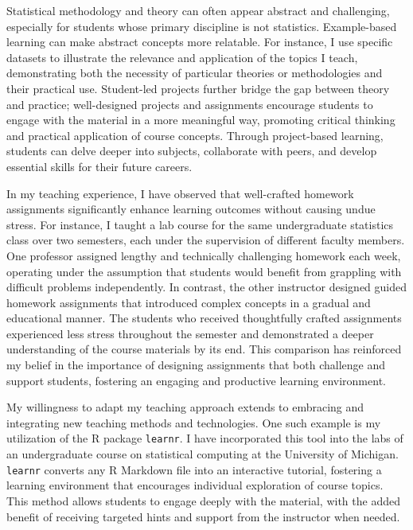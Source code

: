 \documentclass{article}
\begin{document}
Statistical methodology and theory can often appear abstract and challenging, especially for students whose primary discipline is not statistics.
Example-based learning can make abstract concepts more relatable.
For instance, I use specific datasets to illustrate the relevance and application of the topics I teach, demonstrating both the necessity of particular theories or methodologies and their practical use.
Student-led projects further bridge the gap between theory and practice; well-designed projects and assignments encourage students to engage with the material in a more meaningful way, promoting critical thinking and practical application of course concepts.
Through project-based learning, students can delve deeper into subjects, collaborate with peers, and develop essential skills for their future careers.

In my teaching experience, I have observed that well-crafted homework assignments significantly enhance learning outcomes without causing undue stress.
For instance, I taught a lab course for the same undergraduate statistics class over two semesters, each under the supervision of different faculty members.
One professor assigned lengthy and technically challenging homework each week, operating under the assumption that students would benefit from grappling with difficult problems independently.
In contrast, the other instructor designed guided homework assignments that introduced complex concepts in a gradual and educational manner.
The students who received thoughtfully crafted assignments experienced less stress throughout the semester and demonstrated a deeper understanding of the course materials by its end.
This comparison has reinforced my belief in the importance of designing assignments that both challenge and support students, fostering an engaging and productive learning environment.

My willingness to adapt my teaching approach extends to embracing and integrating new teaching methods and technologies.
One such example is my utilization of the R package \texttt{learnr}.
I have incorporated this tool into the labs of an undergraduate course on statistical computing at the University of Michigan.
\texttt{learnr} converts any R Markdown file into an interactive tutorial, fostering a learning environment that encourages individual exploration of course topics.
This method allows students to engage deeply with the material, with the added benefit of receiving targeted hints and support from the instructor when needed.
\end{document}
